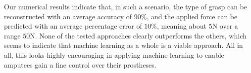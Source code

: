 %

Our numerical results indicate that, in such a scenario, the type of
grasp can be reconstructed with an average accuracy of $90\%$, and the
applied force can be predicted with an average percentage error of
$10\%$, meaning about $5$N over a range $50$N. None of the tested
approaches clearly outperforms the others, which seems to indicate
that machine learning as a whole is a viable approach. All in all,
this looks highly encouraging in applying machine learning to enable
amputees gain a fine control over their prostheses.
